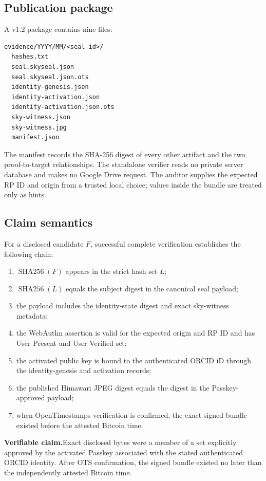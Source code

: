 \documentclass[11pt,a4paper]{article}
\newcommand{\sha}{\operatorname{SHA256}}
\newcommand{\claim}{\textbf{Verifiable claim.}}
\begin{document}
\subsection{Publication package}

A v1.2 package contains nine files:

\begin{lstlisting}
evidence/YYYY/MM/<seal-id>/
  hashes.txt
  seal.skyseal.json
  seal.skyseal.json.ots
  identity-genesis.json
  identity-activation.json
  identity-activation.json.ots
  sky-witness.json
  sky-witness.jpg
  manifest.json
\end{lstlisting}

The manifest records the SHA-256 digest of every other artifact and the two proof-to-target relationships. The standalone verifier reads no private server database and makes no Google Drive request. The auditor supplies the expected RP ID and origin from a trusted local choice; values inside the bundle are treated only as hints.

\subsection{Claim semantics}

For a disclosed candidate $F$, successful complete verification establishes the following chain:

\begin{enumerate}
  \item $\sha(F)$ appears in the strict hash set $L$;
  \item $\sha(L)$ equals the subject digest in the canonical seal payload;
  \item the payload includes the identity-state digest and exact sky-witness metadata;
  \item the WebAuthn assertion is valid for the expected origin and RP ID and has User Present and User Verified set;
  \item the activated public key is bound to the authenticated ORCID iD through the identity-genesis and activation records;
  \item the published Himawari JPEG digest equals the digest in the Passkey-approved payload;
  \item when OpenTimestamps verification is confirmed, the exact signed bundle existed before the attested Bitcoin time.
\end{enumerate}

\claim Exact disclosed bytes were a member of a set explicitly approved by the activated Passkey associated with the stated authenticated ORCID identity. After OTS confirmation, the signed bundle existed no later than the independently attested Bitcoin time.
\end{document}
